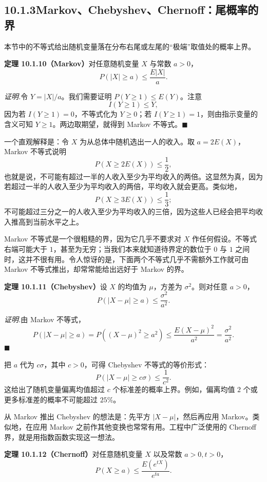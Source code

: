 \documentclass[UTF8, 12pt, fontset=fandol, oneside]{ctexart}
\begin{document}
\subsection*{10.1.3\quad Markov、Chebyshev、Chernoff：尾概率的界}

本节中的不等式给出随机变量落在分布右尾或左尾的“极端”取值处的概率上界。

\noindent\textbf{定理 10.1.10（Markov）}\quad 对任意随机变量 $X$ 与常数 $a>0$，
\[
  P(|X|\ge a)\le \frac{E|X|}{a}.
\]

\noindent\textit{证明.}\quad 令 $Y=|X|/a$。我们需要证明 $P(Y\ge 1)\le E(Y)$。注意
\[
  I(Y\ge 1)\le Y,
\]
因为若 $I(Y\ge 1)=0$，不等式化为 $Y\ge 0$；若 $I(Y\ge 1)=1$，则由指示变量的含义可知 $Y\ge 1$。两边取期望，就得到 Markov 不等式。$\blacksquare$

一个直观解释是：令 $X$ 为从总体中随机选出一人的收入。取 $a=2E(X)$，Markov 不等式说明
\[
  P(X\ge 2E(X))\le \frac12,
\]
也就是说，不可能有超过一半的人收入至少为平均收入的两倍。这显然为真，因为若超过一半的人收入至少为平均收入的两倍，平均收入就会更高。类似地，
\[
  P(X\ge 3E(X))\le \frac13;
\]
不可能超过三分之一的人收入至少为平均收入的三倍，因为这些人已经会把平均收入推高到当前水平之上。

Markov 不等式是一个很粗糙的界，因为它几乎不要求对 $X$ 作任何假设。不等式右端可能大于 $1$，甚至为无穷；当我们本来就知道待界定的数位于 $0$ 与 $1$ 之间时，这并不很有用。令人惊讶的是，下面两个不等式几乎不需额外工作就可由 Markov 不等式推出，却常常能给出远好于 Markov 的界。

\noindent\textbf{定理 10.1.11（Chebyshev）}\quad 设 $X$ 的均值为 $\mu$，方差为 $\sigma^2$。则对任意 $a>0$，
\[
  P(|X-\mu|\ge a)\le \frac{\sigma^2}{a^2}.
\]

\noindent\textit{证明.}\quad 由 Markov 不等式，
\[
  P(|X-\mu|\ge a)=P((X-\mu)^2\ge a^2)
  \le \frac{E(X-\mu)^2}{a^2}
  =\frac{\sigma^2}{a^2}.
\]
$\blacksquare$

把 $a$ 代为 $c\sigma$，其中 $c>0$，可得 Chebyshev 不等式的等价形式：
\[
  P(|X-\mu|\ge c\sigma)\le \frac{1}{c^2}.
\]
这给出了随机变量偏离均值超过 $c$ 个标准差的概率上界。例如，偏离均值 $2$ 个或更多标准差的概率不可能超过 $25\%$。

从 Markov 推出 Chebyshev 的想法是：先平方 $|X-\mu|$，然后再应用 Markov。类似地，在应用 Markov 之前作其他变换也常常有用。工程中广泛使用的 Chernoff 界，就是用指数函数实现这一想法。

\noindent\textbf{定理 10.1.12（Chernoff）}\quad 对任意随机变量 $X$ 以及常数 $a>0,t>0$，
\[
  P(X\ge a)\le \frac{E(e^{tX})}{e^{ta}}.
\]
\end{document}
